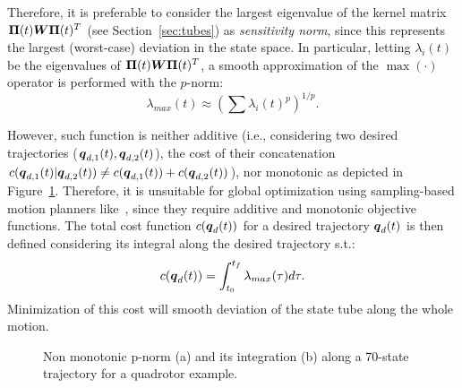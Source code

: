 Therefore, it is preferable to consider the largest eigenvalue of the kernel matrix $\boldsymbol{\Pi}(t) \boldsymbol{W} \boldsymbol{\Pi}(t)^T$ (see Section~\ref{sec:tubes}) as \emph{sensitivity norm}, since this represents the largest (worst-case) deviation in the state space. 
In particular, letting $\lambda_i(t)$ be the eigenvalues of $\boldsymbol{\Pi}(t) \boldsymbol{W} \boldsymbol{\Pi}(t)^T$, a smooth approximation of the $\max(\cdot)$ operator is performed with the $p$-norm:
\begin{equation}
    \lambda_{max}(t)\approx \left(\sum \lambda_{i}(t)^p\right)^{1/p}.
\end{equation} 

However, such function is neither additive (i.e., considering two desired trajectories ($\boldsymbol{q}_{d,1}(t), \boldsymbol{q}_{d,2}(t)$), the cost of their concatenation $c(\boldsymbol{q}_{d,1}(t)|\boldsymbol{q}_{d,2}(t)) \neq c(\boldsymbol{q}_{d,1}(t)) + c(\boldsymbol{q}_{d,2}(t))$), nor monotonic as depicted in Figure~\ref{fig:monotonic}.
Therefore, it is unsuitable for global optimization using sampling-based motion planners like~\cite{cRRTstar, cSST}, since they require additive and monotonic objective functions.
The total cost function $c(\boldsymbol{q}_d(t))$ for a desired trajectory $\boldsymbol{q}_d(t)$ is then defined considering its integral along the desired trajectory s.t.:
\begin{equation} \label{eq:cost_function}
    c(\boldsymbol{q}_d(t))=\int_{t_{0}}^{t_{f}}\lambda_{max}(\tau)d\tau.
\end{equation}
Minimization of this cost will smooth deviation of the state tube along the whole motion.

\begin{figure} [htp]
    \centering
    \caption{Non monotonic p-norm (a) and its integration (b) along a 70-state trajectory for a quadrotor example.}%
    \label{fig:monotonic}%
\end{figure}

